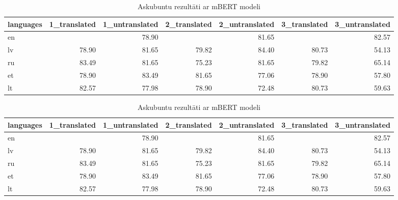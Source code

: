 \begin{table}[htbp]
  \centering
  \caption{Askubuntu rezultāti ar mBERT modeli}
    \begin{tabular}{lrrrrrr} \toprule
    languages & 1\_translated & 1\_untranslated & 2\_translated & 2\_untranslated & 3\_translated & 3\_untranslated \\\midrule
    en    &       & \cellcolor[rgb]{ .984,  .965,  .976}78.90 &       & \cellcolor[rgb]{ .737,  .812,  .914}81.65 &       & \cellcolor[rgb]{ .608,  .722,  .867}82.57 \\
    lv    & \cellcolor[rgb]{ .984,  .965,  .976}78.90 & \cellcolor[rgb]{ .737,  .812,  .914}81.65 & \cellcolor[rgb]{ .988,  .988,  1}79.82 & \cellcolor[rgb]{ .353,  .541,  .776}84.40 & \cellcolor[rgb]{ .863,  .902,  .957}80.73 & \cellcolor[rgb]{ .973,  .412,  .42}54.13 \\
    ru    & \cellcolor[rgb]{ .482,  .631,  .824}83.49 & \cellcolor[rgb]{ .737,  .812,  .914}81.65 & \cellcolor[rgb]{ .984,  .882,  .894}75.23 & \cellcolor[rgb]{ .737,  .812,  .914}81.65 & \cellcolor[rgb]{ .988,  .988,  1}79.82 & \cellcolor[rgb]{ .976,  .655,  .667}65.14 \\
    et    & \cellcolor[rgb]{ .984,  .965,  .976}78.90 & \cellcolor[rgb]{ .482,  .631,  .824}83.49 & \cellcolor[rgb]{ .737,  .812,  .914}81.65 & \cellcolor[rgb]{ .984,  .925,  .937}77.06 & \cellcolor[rgb]{ .984,  .965,  .976}78.90 & \cellcolor[rgb]{ .973,  .494,  .502}57.80 \\
    lt    & \cellcolor[rgb]{ .608,  .722,  .867}82.57 & \cellcolor[rgb]{ .984,  .945,  .957}77.98 & \cellcolor[rgb]{ .984,  .965,  .976}78.90 & \cellcolor[rgb]{ .98,  .824,  .831}72.48 & \cellcolor[rgb]{ .863,  .902,  .957}80.73 & \cellcolor[rgb]{ .973,  .533,  .541}59.63 \\\bottomrule
    \end{tabular}%
  \label{tab:askubuntu-bert}%
\end{table}%

\begin{table}[htbp]
  \centering
  \caption{Askubuntu rezultāti ar mBERT modeli}
    \begin{tabular}{lrrrrrr} \toprule
    languages & 1\_translated & 1\_untranslated & 2\_translated & 2\_untranslated & 3\_translated & 3\_untranslated \\\midrule
    en    &       & 78.90 &       & 81.65 &       & 82.57 \\
    lv    & 78.90 & 81.65 & 79.82 & 84.40 & 80.73 & 54.13 \\
    ru    & 83.49 & 81.65 & 75.23 & 81.65 & 79.82 & 65.14 \\
    et    & 78.90 & 83.49 & 81.65 & 77.06 & 78.90 & 57.80 \\
    lt    & 82.57 & 77.98 & 78.90 & 72.48 & 80.73 & 59.63 \\\bottomrule
    \end{tabular}%
  \label{tab:askubuntu-bert}%
\end{table}%


